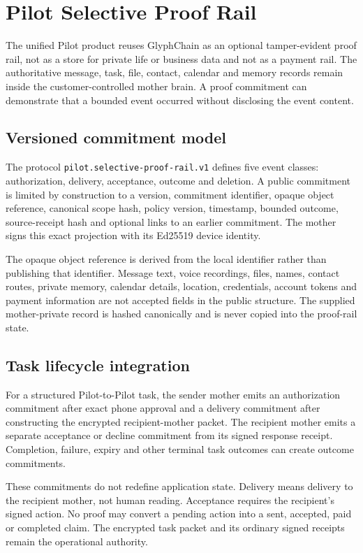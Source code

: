 \section{Pilot Selective Proof Rail}
\label{sec:pilot-mobile-selective-proof}

The unified Pilot product reuses GlyphChain as an optional tamper-evident proof
rail, not as a store for private life or business data and not as a payment rail.
The authoritative message, task, file, contact, calendar and memory records remain
inside the customer-controlled mother brain.  A proof commitment can demonstrate
that a bounded event occurred without disclosing the event content.

\subsection{Versioned commitment model}

The protocol \texttt{pilot.selective-proof-rail.v1} defines five event classes:
authorization, delivery, acceptance, outcome and deletion.  A public commitment is
limited by construction to a version, commitment identifier, opaque object
reference, canonical scope hash, policy version, timestamp, bounded outcome,
source-receipt hash and optional links to an earlier commitment.  The mother signs
this exact projection with its Ed25519 device identity.

The opaque object reference is derived from the local identifier rather than
publishing that identifier.  Message text, voice recordings, files, names, contact
routes, private memory, calendar details, location, credentials, account tokens and
payment information are not accepted fields in the public structure.  The supplied
mother-private record is hashed canonically and is never copied into the proof-rail
state.

\subsection{Task lifecycle integration}

For a structured Pilot-to-Pilot task, the sender mother emits an authorization
commitment after exact phone approval and a delivery commitment after constructing
the encrypted recipient-mother packet.  The recipient mother emits a separate
acceptance or decline commitment from its signed response receipt.  Completion,
failure, expiry and other terminal task outcomes can create outcome commitments.

These commitments do not redefine application state.  Delivery means delivery to
the recipient mother, not human reading.  Acceptance requires the recipient's
signed action.  No proof may convert a pending action into a sent, accepted, paid or
completed claim.  The encrypted task packet and its ordinary signed receipts remain
the operational authority.

